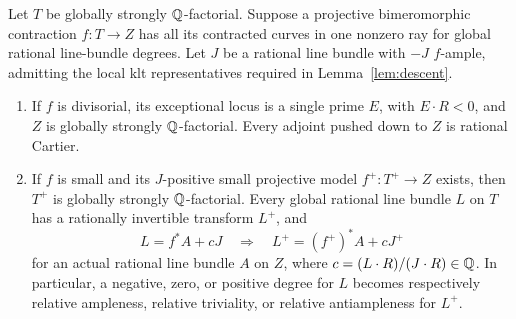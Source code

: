 \begin{lemma}\label{lem:sheaf-step}
Let $T$ be globally strongly $\mathbb Q$-factorial.  Suppose a projective
bimeromorphic contraction $f\colon T\to Z$ has all its contracted
curves in one nonzero ray for global rational line-bundle degrees.
Let $J$ be a rational line bundle with $-J$ $f$-ample, admitting the
local klt representatives required in Lemma~\ref{lem:descent}.
\begin{enumerate}[label=\textup{(\roman*)}]
\item If $f$ is divisorial, its exceptional locus is a single prime
$E$, with $E\cdot R<0$, and $Z$ is globally strongly $\mathbb Q$-factorial.
Every adjoint pushed down to $Z$ is rational Cartier.
\item If $f$ is small and its $J$-positive small projective model
$f^+\colon T^+\to Z$ exists, then $T^+$ is globally strongly
$\mathbb Q$-factorial.  Every global rational line bundle $L$ on $T$ has a
rationally invertible transform $L^+$, and
\begin{equation}\label{eq:step-line-adjustment}
 L=f^*A+cJ\quad\Longrightarrow\quad
 L^+=(f^+)^*A+cJ^+
\end{equation}
for an actual rational line bundle $A$ on $Z$, where
$c=(L\cdot R)/(J\cdot R)\in\mathbb Q$.  In particular, a negative, zero,
or positive degree for $L$ becomes respectively relative ampleness,
relative triviality, or relative antiampleness for $L^+$.
\end{enumerate}
\end{lemma}

